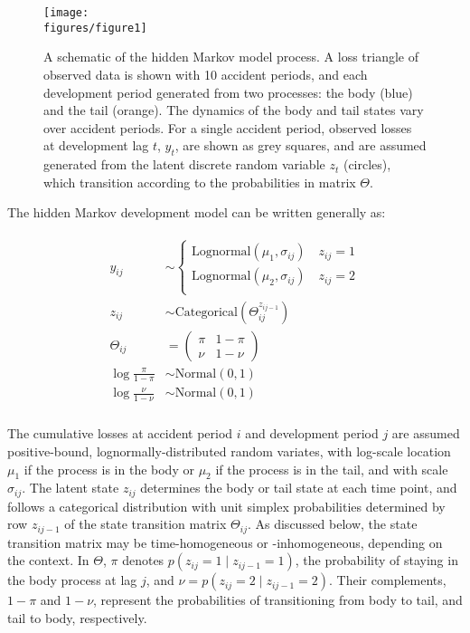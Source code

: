 \begin{figure}[t!]
    \centering
    \texttt{[image: \\figures/figure1]}
    \caption{
        A schematic of the hidden Markov model process.
        A loss triangle of observed data is shown
        with 10 accident periods, and each
        development period generated from
        two processes: the body (blue)
        and the tail (orange). The dynamics of the
        body and tail states vary over accident periods.
        For a single accident
        period, observed losses at
        development lag $t$, $y_{t}$, are shown as grey
        squares, and are assumed generated from the latent
        discrete random variable $z_{t}$ (circles), 
        which transition according to the probabilities
        in matrix $\Theta$.
    }
	\label{fig:schematic}
\end{figure}

The hidden Markov development model can be
written generally as:

\begin{align}
	\begin{split}
	\label{eq:hmm}
	y_{ij} &\sim \begin{cases}
		\mathrm{Lognormal}(\mu_{1}, \sigma_{ij}) \quad z_{ij} = 1\\
		\mathrm{Lognormal}(\mu_{2}, \sigma_{ij}) \quad z_{ij} = 2\\
	\end{cases}\\
    z_{ij} &\sim \mathrm{Categorical}(\Theta^{z_{ij-1}}_{ij})\\
    \Theta_{ij} &= \begin{pmatrix}
        \pi & 1 - \pi\\
        \nu & 1 - \nu
    \end{pmatrix}\\
    \log \frac{\pi}{1 - \pi} &\sim \mathrm{Normal}(0, 1)\\
    \log \frac{\nu}{1 - \nu} &\sim \mathrm{Normal}(0, 1)\\
	\end{split}
\end{align}

The cumulative losses at accident period $i$ and development period $j$
are assumed positive-bound, lognormally-distributed random variates,
with log-scale location $\mu_{1}$ if the process is in the body
or $\mu_{2}$ if the process is in the tail, and with scale $\sigma_{ij}$.
The latent state $z_{ij}$ determines the body or tail state at each
time point, and follows a categorical distribution with unit simplex probabilities
determined by row $z_{ij - 1}$ of the state transition matrix
$\Theta_{ij}$. As discussed below, the state transition matrix
may be time-homogeneous or -inhomogeneous, depending on the context.
In $\Theta$, $\pi$ denotes $p(z_{ij} = 1 \mid z_{ij-1} = 1)$, the 
probability of staying in the body
process at lag $j$, and $\nu = p(z_{ij} = 2 \mid z_{ij-1} = 2)$.
Their complements, $1 - \pi$ and $1 - \nu$, represent the
probabilities of transitioning from body to tail, and tail
to body, respectively.

